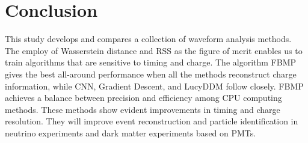 \section{Conclusion}
\label{sec:conclusion}

This study develops and compares a collection of waveform analysis methods. The employ of Wasserstein distance and RSS as the figure of merit enables us to train algorithms that are sensitive to timing and charge. The algorithm FBMP gives the best all-around performance when all the methods reconstruct charge information, while CNN, Gradient Descent, and LucyDDM follow closely. FBMP achieves a balance between precision and efficiency among CPU computing methods. These methods show evident improvements in timing and charge resolution. They will improve event reconstruction and particle identification in neutrino experiments and dark matter experiments based on PMTs. 
